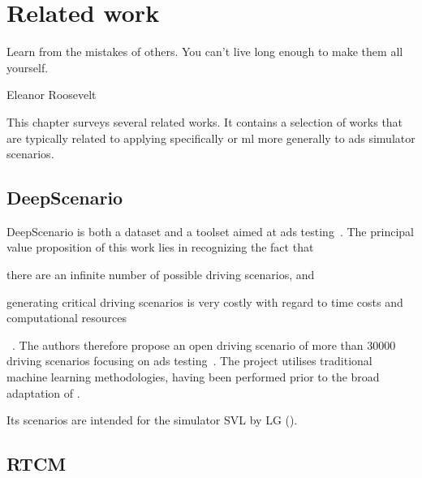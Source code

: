 \chapter{Related work}\label{chp:relatedWork}

\epigraph{Learn from the mistakes of others. You can't live long enough to make them all yourself.}{Eleanor Roosevelt}

This chapter surveys several related works. It contains a selection of works that are typically
related to applying  specifically or \acrshort{ml} more generally to \acrshort{ads}
simulator scenarios.

\section{DeepScenario}\label{sec:deepScenario}

DeepScenario is both a dataset and a toolset aimed at \acrlong{ads} testing~\cite{DeepScenario}. The
principal value proposition of this work lies in recognizing the fact that \begin{inparaenum}
    \item there are an infinite number of possible driving scenarios, and
    \item generating critical driving scenarios is very costly with regard to time costs and
    computational resources\end{inparaenum}~\cite[52]{DeepScenario}. The authors therefore propose
an open driving scenario of more than \num{30000} driving scenarios focusing on \acrshort{ads}
testing~\cite[52]{DeepScenario}. The project utilises traditional machine learning
methodologies, having been performed prior to the broad adaptation of .

Its scenarios are intended for the simulator SVL by LG ().

\section{RTCM}

